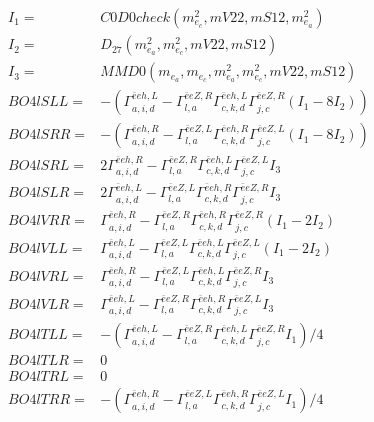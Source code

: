 \documentclass[A4,landscape]{article}
\begin{document}
\begin{align} 
I_1 = & C0D0check(m^2_{e_{{c}}}, mV22, mS12, m^2_{e_{{a}}}) \\ 
I_2 = & D_{27}(m^2_{e_{{a}}}, m^2_{e_{{c}}}, mV22, mS12) \\ 
I_3 = & MMD0(m_{e_{{a}}}, m_{e_{{c}}}, m^2_{e_{{a}}}, m^2_{e_{{c}}}, mV22, mS12) \\ 
  BO4lSLL= & -( \Gamma^{\bar{e}e h ,L}_{a, i, d} - \Gamma^{\bar{e}e Z ,R} _{l, a} \Gamma^{\bar{e}e h ,L}_{c, k, d} \Gamma^{\bar{e}e Z ,R}_{j, c} (I_1 - 8 I_2)) \\ 
  BO4lSRR= & -( \Gamma^{\bar{e}e h ,R}_{a, i, d} - \Gamma^{\bar{e}e Z ,L} _{l, a} \Gamma^{\bar{e}e h ,R}_{c, k, d} \Gamma^{\bar{e}e Z ,L}_{j, c} (I_1 - 8 I_2)) \\ 
  BO4lSRL= & 2  \Gamma^{\bar{e}e h ,R}_{a, i, d} - \Gamma^{\bar{e}e Z ,R} _{l, a} \Gamma^{\bar{e}e h ,L}_{c, k, d} \Gamma^{\bar{e}e Z ,L}_{j, c} I_3 \\ 
  BO4lSLR= & 2  \Gamma^{\bar{e}e h ,L}_{a, i, d} - \Gamma^{\bar{e}e Z ,L} _{l, a} \Gamma^{\bar{e}e h ,R}_{c, k, d} \Gamma^{\bar{e}e Z ,R}_{j, c} I_3 \\ 
  BO4lVRR= &  \Gamma^{\bar{e}e h ,R}_{a, i, d} - \Gamma^{\bar{e}e Z ,R} _{l, a} \Gamma^{\bar{e}e h ,R}_{c, k, d} \Gamma^{\bar{e}e Z ,R}_{j, c} (I_1 - 2 I_2) \\ 
  BO4lVLL= &  \Gamma^{\bar{e}e h ,L}_{a, i, d} - \Gamma^{\bar{e}e Z ,L} _{l, a} \Gamma^{\bar{e}e h ,L}_{c, k, d} \Gamma^{\bar{e}e Z ,L}_{j, c} (I_1 - 2 I_2) \\ 
  BO4lVRL= &  \Gamma^{\bar{e}e h ,R}_{a, i, d} - \Gamma^{\bar{e}e Z ,L} _{l, a} \Gamma^{\bar{e}e h ,L}_{c, k, d} \Gamma^{\bar{e}e Z ,R}_{j, c} I_3 \\ 
  BO4lVLR= &  \Gamma^{\bar{e}e h ,L}_{a, i, d} - \Gamma^{\bar{e}e Z ,R} _{l, a} \Gamma^{\bar{e}e h ,R}_{c, k, d} \Gamma^{\bar{e}e Z ,L}_{j, c} I_3 \\ 
  BO4lTLL= & -( \Gamma^{\bar{e}e h ,L}_{a, i, d} - \Gamma^{\bar{e}e Z ,R} _{l, a} \Gamma^{\bar{e}e h ,L}_{c, k, d} \Gamma^{\bar{e}e Z ,R}_{j, c} I_1)/4 \\ 
  BO4lTLR= & 0 \\ 
  BO4lTRL= & 0 \\ 
  BO4lTRR= & -( \Gamma^{\bar{e}e h ,R}_{a, i, d} - \Gamma^{\bar{e}e Z ,L} _{l, a} \Gamma^{\bar{e}e h ,R}_{c, k, d} \Gamma^{\bar{e}e Z ,L}_{j, c} I_1)/4 \\ 
\end{align} 
\end{document}
